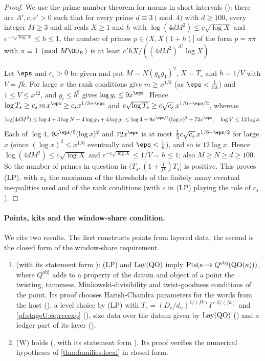 \begin{proof}
We use the prime number theorem for norms in short intervals (): there are
$A',c,c'>0$ such that for every prime $d\equiv3\pmod4$ with $d\ge100$, every integer $M\ge3$ and all reals $X\ge1$ and $h$
with $\log(4dM^2)\le c\sqrt{\log X}$ and $e^{-c\sqrt{\log X}}\le h\le1$, the number of primes $p\in(X,X(1+h)]$ of the form
$p=\pi\bar\pi$ with $\pi\equiv1\pmod{M\OO_K}$ is at least $c'hX/((4dM^2)^{A'}\log X)$.

Let $\eps$ and $c_s>0$ be given and put $M=N(g_0g_1)^2$, $X=T_s$ and $h=1/V$ with $V=fk$. For large $x$ the rank conditions
give $m\ge x^{1/3}$ (as $\eps<\frac1{52}$) and $1\le V\le x^{12}$, and $g_i\le b^9$ gives $\log g_i\le9x^\eps$. Hence
$\log T_s\ge c_s\,m\,x^\eps\ge c_sx^{1/3+\eps}$ and $c\sqrt{\log T_s}\ge c\sqrt{c_s}\,x^{1/6+\eps/2}$, whereas
\[
\log(4dM^2)\le\log4+3\log N+4\log g_0+4\log g_1\le\log4+9x^{\eps/5}(\log x)^2+72x^\eps,
\quad \log V\le12\log x .
\]
Each of $\log4$, $9x^{\eps/5}(\log x)^2$ and $72x^\eps$ is at most $\frac13c\sqrt{c_s}\,x^{1/6+\eps/2}$ for large $x$ (since
$(\log x)^2\le x^{1/6}$ eventually and $\eps<\frac16$), and so is $12\log x$. Hence $\log(4dM^2)\le c\sqrt{\log X}$ and
$e^{-c\sqrt{\log X}}\le1/V=h\le1$; also $M\ge N\ge d\ge100$. So the number of primes in question in
$(T_s,(1+\frac1{fk})T_s]$ is positive. This proves (LP), with $x_0$ the maximum of the thresholds of the finitely many
eventual inequalities used and of the rank conditions (with $c$ in (LP) playing the role of $c_s$).
\end{proof}

\paragraph{Points, kits and the window-share condition.}
We cite two results. The first constructs points from layered data, the second is the closed form of the window-share
requirement.
\begin{enumerate}[label=(\alph*)]
\item {} (with its statement form
): (LP) and $\mathrm{Lay}(\mathrm{QO})$ imply
$\mathrm{Pts}(\kappa\mapsto Q^{\mathrm{obj}}(\mathrm{QO}(\kappa)))$, where $Q^{\mathrm{obj}}$ adds to a property of the datum and
object of a point the twisting, tameness, Minkowski-divisibility and twist-goodness conditions of the point. Its proof
chooses Harish-Chandra parameters for the words from the host (), a level
choice by (LP) with $T_s=(D_s/d_u)^{1/(fk)}\Gamma^{-2/(fk)}$ and \eqref{pf:stageU:eq:recexp}
(), size data over the datum given by $\mathrm{Lay}(\mathrm{QO})$
() and a ledger part of its layer
().
\item (W) holds (, with its statement form
). Its proof verifies the numerical hypotheses of
\cref{thm:families:local} in closed form.
\end{enumerate}

